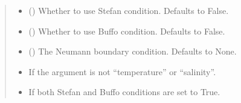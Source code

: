 \documentclass[a4paper,11pt,english,openany]{sphinxmanual}
\begin{document}
\begin{fulllineitems}
\begin{fulllineitems}
\begin{quote}
\begin{description}
\begin{itemize}
\item {} 
\sphinxAtStartPar
{} (\sphinxstyleliteralemphasis{\sphinxupquote{, }}) \textendash{} Whether to use Stefan condition. Defaults to False.

\item {} 
\sphinxAtStartPar
{} (\sphinxstyleliteralemphasis{\sphinxupquote{, }}) \textendash{} Whether to use Buffo condition. Defaults to False.

\item {} 
\sphinxAtStartPar
{} (\sphinxstyleliteralemphasis{\sphinxupquote{, }}) \textendash{} The Neumann boundary condition. Defaults to None.

\end{itemize}

\begin{itemize}
\item {} 
\sphinxAtStartPar
{} \textendash{} If the argument is not “temperature” or “salinity”.

\item {} 
\sphinxAtStartPar
{} \textendash{} If both Stefan and Buffo conditions are set to True.

\end{itemize}

\end{description}\end{quote}

\end{fulllineitems}



\end{fulllineitems}
\end{document}
